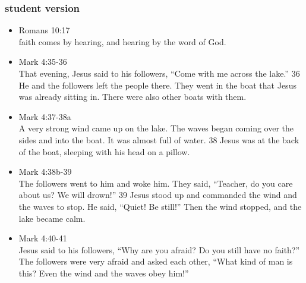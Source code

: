 \subsubsection{student version}
\large
\begin{itemize}

\item Romans 10:17 \\faith comes by hearing, and hearing by the word of God.

\item Mark 4:35-36\\
That evening, Jesus said to his followers, “Come with me across the lake.” 36 He and the followers left the people there. They went in the boat that Jesus was already sitting in. There were also other boats with them. 

\item Mark 4:37-38a\\ A very strong wind came up on the lake. The waves began coming over the sides and into the boat. It was almost full of water. 38 Jesus was at the back of the boat, sleeping with his head on a pillow. 

\item Mark 4:38b-39\\The followers went to him and woke him. They said, “Teacher, do you care about us? We will drown!” 39 Jesus stood up and commanded the wind and the waves to stop. He said, “Quiet! Be still!” Then the wind stopped, and the lake became calm.

\item Mark 4:40-41\\Jesus said to his followers, “Why are you afraid? Do you still have no faith?” The followers were very afraid and asked each other, “What kind of man is this? Even the wind and the waves obey him!”
\end{itemize}




\newpage
